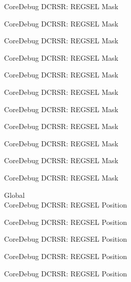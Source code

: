 \begin{DoxyRefList}
\label{deprecated__deprecated000406}%
%
Core\+Debug DCRSR\+: REGSEL Mask 

\label{deprecated__deprecated000495}%
%
Core\+Debug DCRSR\+: REGSEL Mask 

\label{deprecated__deprecated000597}%
%
Core\+Debug DCRSR\+: REGSEL Mask 

\label{deprecated__deprecated000722}%
%
Core\+Debug DCRSR\+: REGSEL Mask 

\label{deprecated__deprecated000810}%
%
Core\+Debug DCRSR\+: REGSEL Mask 

\label{deprecated__deprecated000866}%
%
Core\+Debug DCRSR\+: REGSEL Mask 

\label{deprecated__deprecated000949}%
%
Core\+Debug DCRSR\+: REGSEL Mask 

\label{deprecated__deprecated001008}%
%
Core\+Debug DCRSR\+: REGSEL Mask 

\label{deprecated__deprecated001084}%
%
Core\+Debug DCRSR\+: REGSEL Mask 

\label{deprecated__deprecated001173}%
%
Core\+Debug DCRSR\+: REGSEL Mask 

\label{deprecated__deprecated001275}%
%
Core\+Debug DCRSR\+: REGSEL Mask  
\item[Global \doxylink{group___c_m_s_i_s___core_debug_ga52182c8a9f63a52470244c0bc2064f7b}{Core\+Debug\+\_\+\+DCRSR\+\_\+\+REGSEL\+\_\+\+Pos} ]\hfill \\
\label{deprecated__deprecated000043}%
%
Core\+Debug DCRSR\+: REGSEL Position 

\label{deprecated__deprecated000131}%
%
Core\+Debug DCRSR\+: REGSEL Position 

\label{deprecated__deprecated000187}%
%
Core\+Debug DCRSR\+: REGSEL Position 

\label{deprecated__deprecated000270}%
%
Core\+Debug DCRSR\+: REGSEL Position 

\label{deprecated__deprecated000329}%
%
Core\+Debug DCRSR\+: REGSEL Position 


\end{DoxyRefList}
